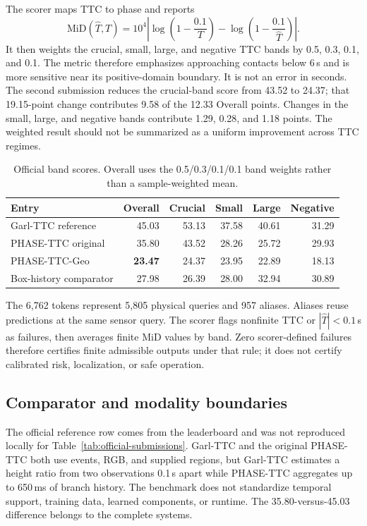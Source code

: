 The scorer maps TTC to phase and reports
\begin{equation}
 \mathrm{MiD}(\widehat T,T)=10^4\left|\log\left(1-\frac{0.1}{T}\right)
 -\log\left(1-\frac{0.1}{\widehat T}\right)\right|.
\end{equation}
It then weights the crucial, small, large, and negative TTC bands by 0.5, 0.3, 0.1, and 0.1. The metric therefore emphasizes approaching contacts below 6\,s and is more sensitive near its positive-domain boundary. It is not an error in seconds. The second submission reduces the crucial-band score from 43.52 to 24.37; that 19.15-point change contributes 9.58 of the 12.33 Overall points. Changes in the small, large, and negative bands contribute 1.29, 0.28, and 1.18 points. The weighted result should not be summarized as a uniform improvement across TTC regimes.

\begin{table}[htbp]
\centering\small
\begin{tabular}{lrrrrr}
\toprule
Entry & Overall & Crucial & Small & Large & Negative \\
\midrule
Garl-TTC reference & 45.03 & 53.13 & 37.58 & 40.61 & 31.29 \\
PHASE-TTC original & 35.80 & 43.52 & 28.26 & 25.72 & 29.93 \\
PHASE-TTC-Geo & \textbf{23.47} & 24.37 & 23.95 & 22.89 & 18.13 \\
Box-history comparator & 27.98 & 26.39 & 28.00 & 32.94 & 30.89 \\
\bottomrule
\end{tabular}
\caption{Official band scores. Overall uses the 0.5/0.3/0.1/0.1 band weights rather than a sample-weighted mean.}
\label{tab:official-submission-bands}
\end{table}

The 6,762 tokens represent 5,805 physical queries and 957 aliases. Aliases reuse predictions at the same sensor query. The scorer flags nonfinite TTC or $|\widehat T|<0.1$\,s as failures, then averages finite MiD values by band. Zero scorer-defined failures therefore certifies finite admissible outputs under that rule; it does not certify calibrated risk, localization, or safe operation.

\subsection{Comparator and modality boundaries}

The official reference row comes from the leaderboard and was not reproduced locally for Table~\ref{tab:official-submissions}. Garl-TTC and the original PHASE-TTC both use events, RGB, and supplied regions, but Garl-TTC estimates a height ratio from two observations 0.1\,s apart while PHASE-TTC aggregates up to 650\,ms of branch history. The benchmark does not standardize temporal support, training data, learned components, or runtime. The 35.80-versus-45.03 difference belongs to the complete systems.

